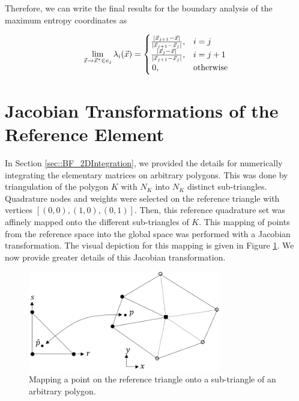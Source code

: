 \noindent Therefore, we can write the final results for the boundary analysis of the maximum entropy coordinates as 

\begin{equation}
\label{eq::App_BF_MV_faceFINAL}
\lim\displaylimits_{\vec{x} \rightarrow \vec{x}^* \in e_j} \lambda_i (\vec{x}) = 
\begin{cases}
\frac{| \vec{x}_{j+1} - \vec{x} |}{| \vec{x}_{j+1} - \vec{x}_{j} |},&i=j\\
\frac{| \vec{x}_{j} - \vec{x} |}{| \vec{x}_{j+1} - \vec{x}_{j} |},&i=j+1\\
\,0,&\text{otherwise}
\end{cases}
\end{equation} 

\section{Jacobian Transformations of the Reference Element}
\label{sec::appendix_BF_Jac}

In Section \ref{sec::BF_2DIntegration}, we provided the details for numerically integrating the elementary matrices on arbitrary polygons. This was done by triangulation of the polygon $K$ with $N_K$ into $N_K$ distinct sub-triangles. Quadrature nodes and weights were selected on the reference triangle with vertices $\left[  (0,0),(1,0),(0,1) \right]$. Then, this reference quadrature set was affinely mapped onto the different sub-triangles of $K$. This mapping of points from the reference space into the global space was performed with a Jacobian transformation. The visual depiction for this mapping is given in Figure \ref{fig::App_BF_2D_tri_mapping}. We now provide greater details of this Jacobian transformation.

\begin{figure}
\centering
\includegraphics[width=0.75\textwidth]{figures/appendices/triangle_mapping_Rev1.png}
\caption{Mapping a point on the reference triangle onto a sub-triangle of an arbitrary polygon.}
\label{fig::App_BF_2D_tri_mapping}
\end{figure}



